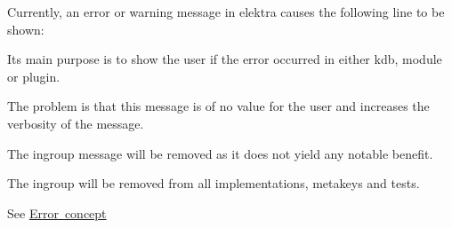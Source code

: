 Currently, an error or warning message in elektra causes the following line to be shown\+:


\begin{DoxyCode}{0}
\end{DoxyCode}


Its main purpose is to show the user if the error occurred in either {\ttfamily kdb}, {\ttfamily module} or {\ttfamily plugin}.

The problem is that this message is of no value for the user and increases the verbosity of the message.

The {\ttfamily ingroup} message will be removed as it does not yield any notable benefit.

The {\ttfamily ingroup} will be removed from all implementations, metakeys and tests.

See \mbox{\hyperlink{doc_decisions_error_codes_md}{Error concept}}